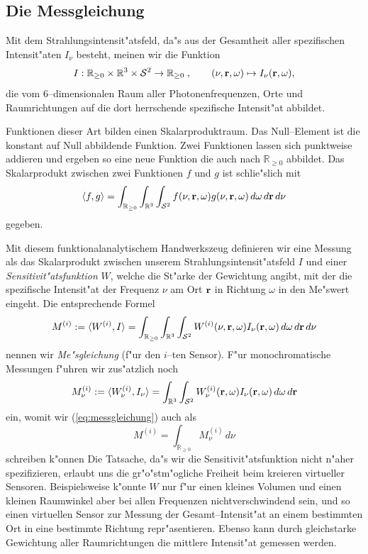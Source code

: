 	
	\subsection{Die Messgleichung}
	Mit dem Strahlungsintensit"atsfeld, da"s aus der Gesamtheit aller spezifischen Intensit"aten $I_\nu$ besteht, meinen wir die Funktion
	$$I:\mathbb{R}_{\geq 0}\times\mathbb{R}^3\times\mathcal{S}^2\to\mathbb{R}_{\geq 0}\;,\qquad (\nu,\mathbf{r},\omega)\mapsto I_\nu(\mathbf{r},\omega),$$
	die vom 6--dimensionalen Raum aller Photonenfrequenzen, Orte und Raumrichtungen auf die dort herrschende spezifische Intensit"at abbildet.
	
	Funktionen dieser Art bilden einen Skalarproduktraum. Das Null--Element ist die konstant auf Null abbildende Funktion. Zwei Funktionen lassen sich punktweise addieren und ergeben so eine neue Funktion die auch nach $\mathbb{R}_{\geq 0}$ abbildet. Das Skalarprodukt zwischen zwei Funktionen $f$ und $g$ ist schlie"slich mit
	$$\langle f,g\rangle=\int_{\mathbb{R}_{\geq 0}} \int_{\mathbb{R}^3} \int_{\mathcal{S}^2} f(\nu,\mathbf{r},\omega)g(\nu,\mathbf{r},\omega)\,d\omega\,d\mathbf{r}\,d\nu$$
	gegeben.
	
	Mit diesem funktionalanalytischem Handwerkszeug definieren wir eine Messung als das Skalarprodukt zwischen unserem Strahlungsintensit"atsfeld $I$ und einer {\em Sensitivit"atsfunktion} $W$, welche die St"arke der Gewichtung angibt, mit der die spezifische Intensit"at der Frequenz $\nu$ am Ort $\mathbf{r}$ in Richtung $\omega$ in den Me"swert eingeht. Die entsprechende Formel
	\begin{equation}\label{eq:messgleichung}
		M^{(i)}:=\langle W^{(i)},I\rangle=\int_{\mathbb{R}_{\geq 0}} \int_{\mathbb{R}^3} \int_{\mathcal{S}^2} W^{(i)}(\nu,\mathbf{r},\omega)I_\nu(\mathbf{r},\omega)\,d\omega\,d\mathbf{r}\,d\nu
	\end{equation}
	nennen wir {\em Me"sgleichung} (f"ur den $i$--ten Sensor). F"ur monochromatische Messungen f"uhren wir zus"atzlich noch 
	\begin{equation}\label{eq:messgleichung_mono}
		M_\nu^{(i)}:=\langle W_\nu^{(i)},I_\nu\rangle=\int_{\mathbb{R}^3} \int_{\mathcal{S}^2} W_\nu^{(i)}(\mathbf{r},\omega)I_\nu(\mathbf{r},\omega)\,d\omega\,d\mathbf{r}
	\end{equation}
	ein, womit wir (\ref{eq:messgleichung}) auch als
	\begin{equation}\label{eq:messgleichung_frommonos}
		M^{(i)}=\int_{\mathbb{R}_{\geq 0}} M_\nu^{(i)}\,d\nu
	\end{equation}
	schreiben k"onnen
	Die Tatsache, da"s wir die Sensitivit"atsfunktion nicht n"aher spezifizieren, erlaubt uns die gr"o"stm"ogliche Freiheit beim kreieren virtueller Sensoren. Beispielsweise k"onnte $W$ nur f"ur einen kleines Volumen und einen kleinen Raumwinkel aber bei allen Frequenzen nichtverschwindend sein, und so einen virtuellen Sensor zur Messung der Gesamt--Intensit"at an einem bestimmten Ort in eine bestimmte Richtung repr"asentieren. Ebenso kann durch gleichstarke Gewichtung aller Raumrichtungen die mittlere Intensit"at gemessen werden.
	
